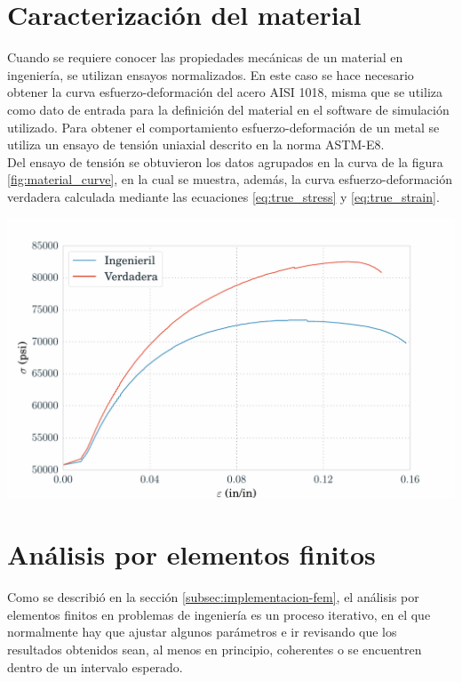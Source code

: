 \section{Caracterización del material}

Cuando se requiere conocer las propiedades mecánicas de un material en ingeniería, se utilizan ensayos 
normalizados. En este caso se hace necesario obtener la curva esfuerzo-deformación del 
acero AISI 1018, misma que se utiliza como dato de entrada para la definición del material 
en el software de simulación utilizado. Para obtener el comportamiento esfuerzo-deformación 
de un metal se utiliza un ensayo de tensión uniaxial descrito en la norma ASTM-E8. ~\cite{ASTME8} \\

Del ensayo de tensión se obtuvieron los datos agrupados en la curva de la figura \ref{fig:material_curve}, 
en la cual se muestra, además, la curva esfuerzo-deformación verdadera calculada mediante las ecuaciones 
\ref{eq:true_stress} y \ref{eq:true_strain}.

\begin{center}
\includegraphics[scale=0.6]{src/ch3/material_curve.pdf}
\label{fig:material_curve}
\end{center}

\section{Análisis por elementos finitos}

Como se describió en la sección \ref{subsec:implementacion-fem}, el análisis por elementos 
finitos en problemas de ingeniería es un proceso iterativo, en el que normalmente hay que ajustar 
algunos parámetros e ir revisando que los resultados obtenidos sean, al menos en principio, 
coherentes o se encuentren dentro de un intervalo esperado. \\

